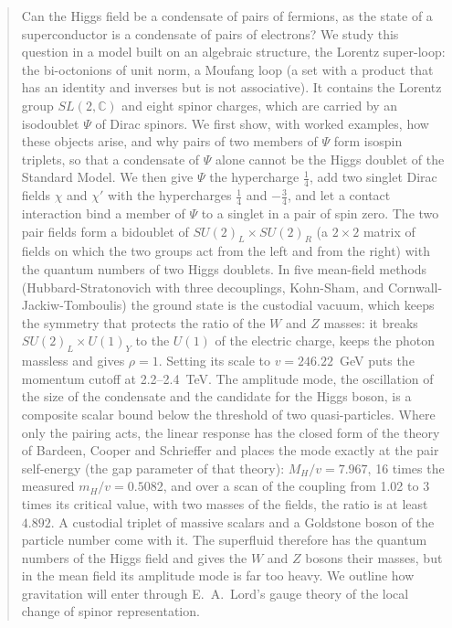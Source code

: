 \documentclass[11pt]{article}
\begin{document}
\begin{quote}
Can the Higgs field be a condensate of pairs of fermions, as the state of a superconductor is a condensate of pairs of electrons? We study this question in a model built on an algebraic structure, the Lorentz super-loop: the bi-octonions of unit norm, a Moufang loop (a set with a product that has an identity and inverses but is not associative). It contains the Lorentz group $SL(2,\mathbb C)$ and eight spinor charges, which are carried by an isodoublet $\Psi$ of Dirac spinors. We first show, with worked examples, how these objects arise, and why pairs of two members of $\Psi$ form isospin triplets, so that a condensate of $\Psi$ alone cannot be the Higgs doublet of the Standard Model. We then give $\Psi$ the hypercharge $\frac14$, add two singlet Dirac fields $\chi$ and $\chi'$ with the hypercharges $\frac14$ and $-\frac34$, and let a contact interaction bind a member of $\Psi$ to a singlet in a pair of spin zero. The two pair fields form a bidoublet of $SU(2)_L\times SU(2)_R$ (a $2\times2$ matrix of fields on which the two groups act from the left and from the right) with the quantum numbers of two Higgs doublets. In five mean-field methods (Hubbard-Stratonovich with three decouplings, Kohn-Sham, and Cornwall-Jackiw-Tomboulis) the ground state is the custodial vacuum, which keeps the symmetry that protects the ratio of the $W$ and $Z$ masses: it breaks $SU(2)_L\times U(1)_Y$ to the $U(1)$ of the electric charge, keeps the photon massless and gives $\rho=1$. Setting its scale to $v=246.22$~GeV puts the momentum cutoff at 2.2\mbox{--}2.4~TeV. The amplitude mode, the oscillation of the size of the condensate and the candidate for the Higgs boson, is a composite scalar bound below the threshold of two quasi-particles. Where only the pairing acts, the linear response has the closed form of the theory of Bardeen, Cooper and Schrieffer and places the mode exactly at the pair self-energy (the gap parameter of that theory): $M_H/v=7.967$, 16 times the measured $m_H/v=0.5082$, and over a scan of the coupling from 1.02 to 3 times its critical value, with two masses of the fields, the ratio is at least \ensuremath{4.892}. A custodial triplet of massive scalars and a Goldstone boson of the particle number come with it. The superfluid therefore has the quantum numbers of the Higgs field and gives the $W$ and $Z$ bosons their masses, but in the mean field its amplitude mode is far too heavy. We outline how gravitation will enter through E.~A.~Lord's gauge theory of the local change of spinor representation.
\end{quote}
\end{document}
